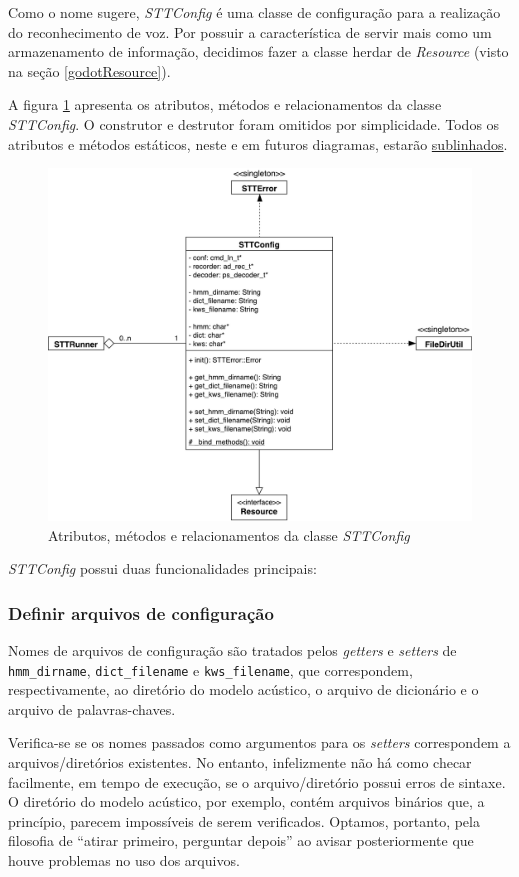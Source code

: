 Como o nome sugere, \textit{STTConfig} é uma classe de configuração para a realização do reconhecimento de voz. Por possuir a característica de servir mais como um armazenamento de informação, decidimos fazer a classe herdar de \textit{Resource} (visto na seção \ref{godotResource}).

A figura \ref{stt-config-diagram} apresenta os atributos, métodos e relacionamentos da classe \textit{STTConfig}. O construtor e destrutor foram omitidos por simplicidade. Todos os atributos e métodos estáticos, neste e em futuros diagramas, estarão \underline{sublinhados}.

\begin{figure}[H]
  \centering
  \includegraphics[width=.9\textwidth]{image/stt-config.pdf}
  \caption{Atributos, métodos e relacionamentos da classe \textit{STTConfig}}
  \label{stt-config-diagram}
\end{figure}

\textit{STTConfig} possui duas funcionalidades principais:

\subsubsection{Definir arquivos de configuração}

Nomes de arquivos de configuração são tratados pelos \textit{getters} e \textit{setters} de \texttt{hmm\_dirname}, \texttt{dict\_filename} e \texttt{kws\_filename}, que correspondem, respectivamente, ao diretório do modelo acústico, o arquivo de dicionário e o arquivo de palavras-chaves.

Verifica-se se os nomes passados como argumentos para os \textit{setters} correspondem a arquivos/diretórios existentes. No entanto, infelizmente não há como checar facilmente, em tempo de execução, se o arquivo/diretório possui erros de sintaxe. O diretório do modelo acústico, por exemplo, contém arquivos binários que, a princípio, parecem impossíveis de serem verificados. Optamos, portanto, pela filosofia de ``atirar primeiro, perguntar depois'' ao avisar posteriormente que houve problemas no uso dos arquivos.

